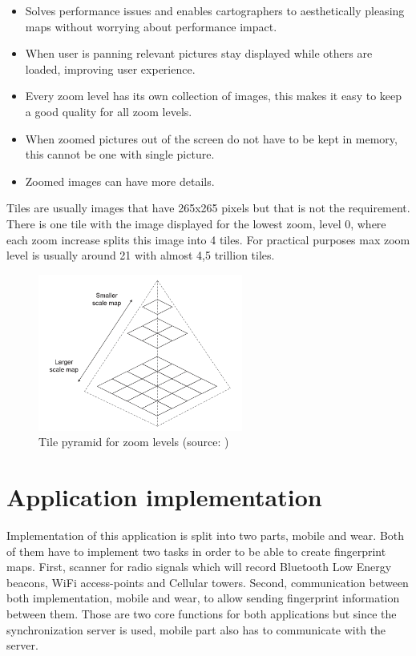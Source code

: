 \begin{itemize}
	\item Solves performance issues and enables cartographers to aesthetically pleasing maps without worrying about performance impact.
	\item When user is panning relevant pictures stay displayed while others are loaded, improving user experience.
	\item Every zoom level has its own collection of images, this makes it easy to keep a good quality for all zoom levels.
	\item When zoomed pictures out of the screen do not have to be kept in memory, this cannot be one with single picture.
	\item Zoomed images can have more details.
\end{itemize}

Tiles are usually images that have 265x265 pixels but that is not the requirement. There is one tile with the image displayed for the lowest zoom, level 0, where each zoom increase splits this image into 4 tiles. For practical purposes max zoom level is usually around 21 with almost 4,5 trillion tiles.

\begin{figure}[H]
	\begin{centering}
		\includegraphics[width=0.6\textwidth]{img/tile_pyramid}
		\par\end{centering}
	\caption{Tile pyramid for zoom levels (source: \cite{WTM})\label{fig:TilePyramid}}
	\label{fig02c05}
\end{figure}


\section{Application implementation}\label{sec:ApplicationImplementation}
Implementation of this application is split into two parts, mobile and wear. Both of them have to implement two tasks in order to be able to create fingerprint maps. First, scanner for radio signals which will record Bluetooth Low Energy beacons, WiFi access-points and Cellular towers. Second, communication between both implementation, mobile and wear, to allow sending fingerprint information between them. Those are two core functions for both applications but since the synchronization server is used, mobile part also has to communicate with the server.


